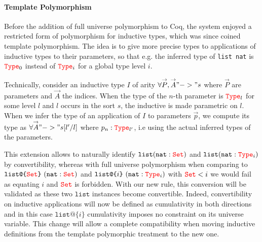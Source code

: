 \documentclass{easychair}
\newcommand{\Type}[1]{{\color{red} \mathtt{Type}}_{#1}}
\newcommand{\Set}{{\color{red} \mathtt{Set}}}
\begin{document}
\def\vec#1{\overset{\rightarrow}{#1}}
\def\clist{\texttt{list}}
\def\nat{\texttt{nat}}
\def\ulist#1{\texttt{list@\{}#1\texttt{\}}}
\paragraph{Template Polymorphism}

Before the addition of full universe polymorphism to Coq, the system
enjoyed a restricted form of polymorphism for inductive types, which was
since coined template polymorphism. The idea is to give more precise
types to applications of inductive types to their parameters, so that
e.g. the inferred type of \texttt{list nat} is $\Type{0}$ instead of
$\Type{i}$ for a global type level $i$.

Technically, consider an inductive type $I$ of arity
$\forall \vec{P}, \vec{A} "->" s$ where $\vec{P}$ are parameters and
$\vec{A}$ the indices.  When the type of the $n$-th parameter is
$\Type{l}$ for some level $l$ and $l$ occurs in the sort $s$, the
inductive is made parametric on $l$. When we infer the type of an
application of $I$ to parameters $\vec{p}$, we compute its type as
$\forall \vec{A} "->" s[l'/l]$ where $p_n : \Type{l'}$, i.e using the
actual inferred types of the parameters.

This extension allows to naturally identify $\clist (\nat : \Set)$ and
$\clist (\nat : \Type{i})$ by convertibility, whereas with full universe
polymorphism when comparing to $\ulist{\Set}~(\nat : \Set)$ and
$\ulist{i}~ (\nat : \Type{i})$ with $\Set < i$ we would fail as equating
$i$ and $\Set$ is forbidden. With our new rule, this conversion will be
validated as these two $\texttt{list}$ instances become convertible.
Indeed, convertibility on inductive applications will now be defined as
cumulativity in both directions and in this case $\ulist{i}$
cumulativity imposes no constraint on its universe variable. This change
will allow a complete compatibility when moving inductive definitions
from the template polymorphic treatment to the new one.
\end{document}
